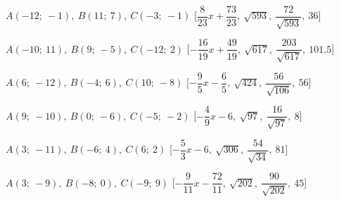 \begin{esercizio}
\begin{enumeratea}
  \item  $A(-12;~-1),~B(11;~7),~C(-3;~-1)$ \hfill 
   [$\dfrac{8}{23} x +\dfrac{73}{23},~\sqrt{593},~\dfrac{72}{\sqrt{593}},~36$]
  \item  $A(-10;~11),~B(9;~-5),~C(-12;~2)$ \hfill 
   [$-\dfrac{16}{19} x 
+\dfrac{49}{19},~\sqrt{617},~\dfrac{203}{\sqrt{617}},~101.5$]
  \item  $A(6;~-12),~B(-4;~6),~C(10;~-8)$ \hfill 
   [$-\dfrac{9}{5} x -\dfrac{6}{5},~\sqrt{424},~\dfrac{56}{\sqrt{106}},~56$]
  \item  $A(9;~-10),~B(0;~-6),~C(-5;~-2)$ \hfill 
   [$-\dfrac{4}{9} x -6,~\sqrt{97},~\dfrac{16}{\sqrt{97}},~8$]
  \item  $A(3;~-11),~B(-6;~4),~C(6;~2)$ \hfill 
   [$-\dfrac{5}{3} x -6,~\sqrt{306},~\dfrac{54}{\sqrt{34}},~81$]
  \item  $A(3;~-9),~B(-8;~0),~C(-9;~9)$ \hfill 
   [$-\dfrac{9}{11} x -\dfrac{72}{11},~\sqrt{202},~\dfrac{90}{\sqrt{202}},~45$]
 \end{enumeratea}
\end{esercizio}

